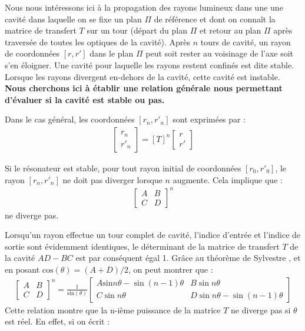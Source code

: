 \documentclass[a4paper]{article}
\begin{document}
Nous nous intéressons ici à la propagation des rayons lumineux dans une une cavité dans laquelle on se fixe un plan $\Pi$ de référence et dont on connaît la matrice de transfert $T$ sur un tour (départ du plan $\Pi$ et retour au plan $\Pi$ après traversée de toutes les optiques de la cavité).
Après $n$ tours de cavité, un rayon de coordonnées $\left[r, r'\right]$ dans le plan $\Pi$ peut soit rester au voisinage de l'axe soit s'en éloigner. Une cavité pour laquelle les rayons restent confinés est dite stable. Lorsque les rayons divergent en-dehors de la cavité, cette cavité est instable. 
\textbf{Nous cherchons ici à établir une relation générale nous permettant d'évaluer si la cavité est stable ou pas.}  

Dans le cas général, les coordonnées $\left[r_n, r'_n\right]$ sont exprimées par :
\begin{gather}
 \begin{bmatrix} r_n \\ r'_n \end{bmatrix}
 =
\left[T\right]^n
   \begin{bmatrix} r \\ r' \end{bmatrix}
\end{gather}

Si le résonateur est stable, pour tout rayon initial de coordonnées $\left[r_0, r'_0\right]$, le rayon $\left[r_n, r'_n\right]$ ne doit pas diverger lorsque $n$ augmente. Cela implique que :
\begin{gather}
  \begin{bmatrix}
   A & B \\
   C & D 
   \end{bmatrix}^n
\end{gather}
ne diverge pas.

Lorsqu'un rayon effectue un tour complet de cavité, l'indice d'entrée et l'indice de sortie sont évidemment identiques, le déterminant de la matrice de transfert $T$ de la cavité $AD-BC$ est par conséquent égal  1. Grâce au théorème de Sylvestre \cite{bornwolf}, et en posant $\mathrm{cos}(\theta) = (A+D)/2$, on peut montrer que :
\begin{gather}
  \begin{bmatrix}
   A & B \\
   C & D 
   \end{bmatrix}^n
 =\frac{1}{\mathrm{sin}(\theta)}
   \begin{bmatrix}
   A \mathrm{sin}n\theta - \sin(n-1)\theta & B\sin n\theta \\
   C\sin n\theta & D\sin n\theta - \sin(n-1)\theta 
   \end{bmatrix}
\end{gather}
Cette relation montre que la n-ième puissance de la matrice $T$ ne diverge pas si $\theta$ est réel. En effet, si on écrit :
\end{document}
